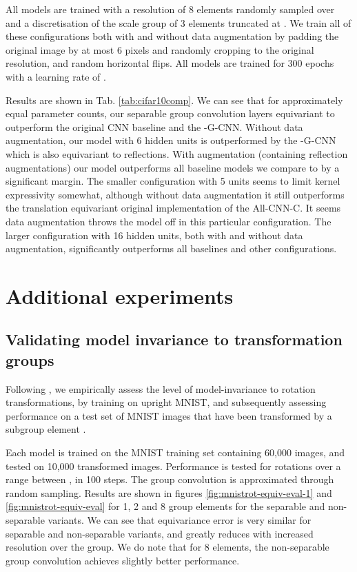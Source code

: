 \documentclass[nohyperref]{article}
\theoremstyle{plain}
\theoremstyle{definition}
\theoremstyle{remark}
\begin{document}
All models are trained with a resolution of 8 elements randomly sampled over  and a discretisation of the scale group of 3 elements truncated at . We train all of these configurations both with and without data augmentation by padding the original image by at most 6 pixels and randomly cropping to the original resolution, and random horizontal flips. All models are trained for 300 epochs with a learning rate of .

Results are shown in Tab. \ref{tab:cifar10comp}. We can see that for approximately equal parameter counts, our separable group convolution layers equivariant to  outperform the original CNN baseline and the -G-CNN. Without data augmentation, our model with 6 hidden units is outperformed by the -G-CNN which is also equivariant to reflections. With augmentation (containing reflection augmentations) our model outperforms all baseline models we compare to by a significant margin. The smaller configuration with 5 units seems to limit kernel expressivity somewhat, although without data augmentation it still outperforms the translation equivariant original implementation of the All-CNN-C. It seems data augmentation throws the model off in this particular configuration. The larger configuration with 16 hidden units, both with and without data augmentation, significantly outperforms all baselines and other configurations.

\section{Additional experiments}
\subsection{Validating model invariance to transformation groups} \label{app:equivariancetest}
Following \citet{weiler2018learning}, we empirically assess the level of model-invariance to rotation transformations, by training on upright MNIST, and subsequently assessing performance on a test set of MNIST images that have been transformed by a subgroup element .

Each model is trained on the MNIST training set containing 60,000 images, and tested on 10,000 transformed images. Performance is tested for rotations over a range between , in 100 steps. The group convolution is approximated through random sampling. Results are shown in figures \ref{fig:mnistrot-equiv-eval-1} and \ref{fig:mnistrot-equiv-eval} for 1, 2 and 8 group elements for the separable and non-separable variants. We can see that equivariance error is very similar for separable and non-separable variants, and greatly reduces with increased resolution over the group. We do note that for 8 elements, the non-separable group convolution achieves slightly better performance. 
\end{document}
